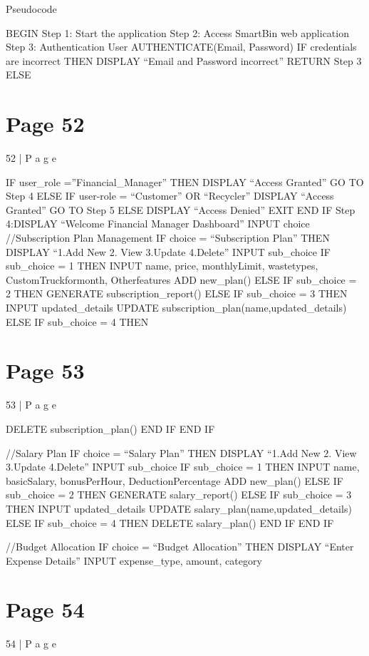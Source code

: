 \documentclass{article}
\begin{document}
 
Pseudocode 
 
BEGIN 
 Step 1: Start the application 
 Step 2: Access SmartBin web application 
 Step 3: Authentication User 
  AUTHENTICATE(Email, Password) 
  IF credentials are incorrect THEN 
   DISPLAY “Email and Password incorrect” 
RETURN Step 3 
  ELSE  

\section*{Page 52}
52 | P a g e 
 
   IF user\_role =”Financial\_Manager” THEN 
    DISPLAY “Access Granted” 
    GO TO Step 4 
   ELSE IF user-role = “Customer” OR “Recycler” 
    DISPLAY “Access Granted” 
    GO TO Step 5 
   ELSE  
    DISPLAY “Access Denied” 
    EXIT 
   END IF 
 Step 4:DISPLAY “Welcome Financial Manager Dashboard” 
  INPUT choice 
  //Subscription Plan Management 
  IF choice = “Subscription Plan” THEN 
   DISPLAY “1.Add New   2. View   3.Update   4.Delete” 
   INPUT sub\_choice 
   IF sub\_choice = 1 THEN 
INPUT name, price, monthlyLimit, wastetypes, 
CustomTruckformonth, Otherfeatures 
ADD new\_plan() 
   ELSE IF sub\_choice = 2 THEN 
    GENERATE subscription\_report() 
   ELSE IF sub\_choice = 3 THEN 
    INPUT updated\_details 
    UPDATE subscription\_plan(name,updated\_details) 
   ELSE IF sub\_choice = 4 THEN 

\section*{Page 53}
53 | P a g e 
 
    DELETE subscription\_plan() 
   END IF 
  END IF 
   
  //Salary Plan  
  IF choice = “Salary Plan” THEN 
   DISPLAY “1.Add New   2. View   3.Update   4.Delete” 
   INPUT sub\_choice 
   IF sub\_choice = 1 THEN 
INPUT name, basicSalary, bonusPerHour, 
DeductionPercentage 
ADD new\_plan() 
   ELSE IF sub\_choice = 2 THEN 
    GENERATE salary\_report() 
   ELSE IF sub\_choice = 3 THEN 
    INPUT updated\_details 
    UPDATE salary\_plan(name,updated\_details) 
   ELSE IF sub\_choice = 4 THEN 
    DELETE salary\_plan() 
   END IF 
  END IF 
 
  //Budget Allocation 
  IF choice = “Budget Allocation” THEN 
   DISPLAY “Enter Expense Details” 
   INPUT expense\_type, amount, category 

\section*{Page 54}
54 | P a g e 
 
\end{document}
